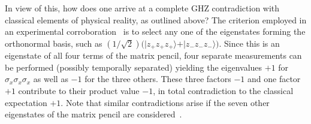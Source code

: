 \documentclass[
  twocolumn,
 showpacs,
 showkeys,
 preprintnumbers,
 amsmath,amssymb,
 aps,
 prl,
  longbibliography,
 floatfix,
 ]{revtex4-2}
\newcommand\myotimes{ }
\begin{document}
In view of this, how does one arrive at a complete GHZ contradiction with classical elements of physical reality, as outlined above?
The criterion employed in an experimental corroboration~\cite{panbdwz} is to select any one of the eigenstates forming the orthonormal basis, such as
$
(1/\sqrt{2})
\big(
\vert z_+z_+z_+ \rangle  + \vert z_-z_-z_- \rangle
\big)
$.
Since this is an eigenstate of all four terms of the matrix pencil, four separate measurements can be performed (possibly temporally separated) yielding the eigenvalues
$+1$ for
$\sigma_x \myotimes  \sigma_x \myotimes  \sigma_x$
as well as $-1$ for the three others. These three factors  $-1$ and one factor $+1$ contribute to their product value $-1$, in total contradiction to the classical expectation $+1$.
Note that similar contradictions arise if the seven other eigenstates of the matrix pencil are considered~\cite[Table~1]{svozil-2020-ghz}.


\end{document}
